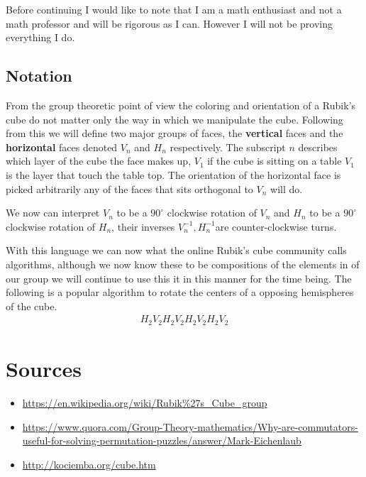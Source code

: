 \documentclass{article}
\begin{document}
\bigskip
Before continuing I would like to note that I am a math enthusiast and not a math professor and will be rigorous as I can. However I will not be proving everything I do.

\subsection{Notation}
From the group theoretic point of view the coloring and orientation of a Rubik's cube do not matter only the way in which we manipulate the cube.
Following from this we will define two major groups of faces, the \textbf{vertical} faces and the \textbf{horizontal} faces denoted $V_{n}$ and $H_{n}$ respectively. The subscript $n$ describes which layer of the cube the face makes up, $V_{1}$ if the cube is sitting on a table $V_{1}$ is the layer that touch the table top. The orientation of the horizontal face is picked arbitrarily any of the faces that sits orthogonal to $V_{n}$ will do.

We now can interpret $V_{n}$ to be a $90^{\circ}$ clockwise rotation of $V_{n}$ and $H_{n}$ to be a $90^{\circ}$ clockwise rotation of $H_{n}$, their inverses $V_{n}^{-1},H_{n}^{-1}$are counter-clockwise turns.


With this language we can now what the online Rubik's cube community calls algorithms, although we now know these to be compositions of the elements in of our group we will continue to use this it in this manner for the time being. The following is a popular algorithm to rotate the centers of a opposing hemispheres of the cube.
\begin{align*}
    H_{2}V_{2}H_{2}V_{2}H_{2}V_{2}H_{2}V_{2}
\end{align*}
\section{Sources}
\begin{itemize}
    \item \url{https://en.wikipedia.org/wiki/Rubik\%27s\_Cube\_group}
    \item \url{https://www.quora.com/Group-Theory-mathematics/Why-are-commutators-useful-for-solving-permutation-puzzles/answer/Mark-Eichenlaub}
    \item \url{http://kociemba.org/cube.htm}
\end{itemize}
\end{document}
